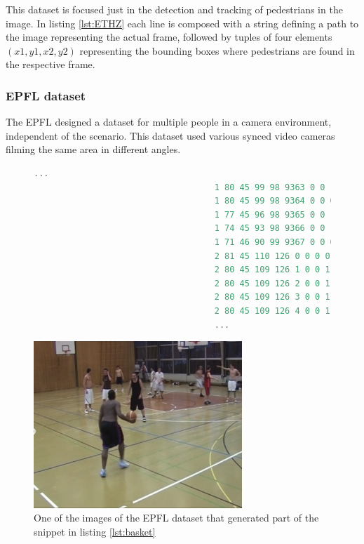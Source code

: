 This dataset is focused just in the detection and tracking of pedestrians in the image. \cite{ETHZEidgenossischeTechnischeHochschuleZurich} In listing \ref{lst:ETHZ} each line is composed with a string defining a path to the image representing the actual frame, followed by tuples of four elements $(x1,y1,x2,y2)$ representing the bounding boxes where pedestrians are found in the respective frame. 

\subsubsection{EPFL dataset}
The EPFL designed a dataset for multiple people in a camera environment, independent of the scenario. This dataset used various synced video cameras filming the same area in different angles. 

\begin{figure}
\begin{center}
	\begin{lstlisting}[label={lst:basket}, caption={ETHZ dataset file snippet.},language=c++]
									...
									1 80 45 99 98 9363 0 0 1 "PERSON"
									1 80 45 99 98 9364 0 0 0 "PERSON"
									1 77 45 96 98 9365 0 0 1 "PERSON"
									1 74 45 93 98 9366 0 0 1 "PERSON"
									1 71 46 90 99 9367 0 0 0 "PERSON"
									2 81 45 110 126 0 0 0 0 "PERSON"
									2 80 45 109 126 1 0 0 1 "PERSON"
									2 80 45 109 126 2 0 0 1 "PERSON"
									2 80 45 109 126 3 0 0 1 "PERSON"
									2 80 45 109 126 4 0 0 1 "PERSON"
									...	\end{lstlisting}
\end{center}
\end{figure}

\begin{figure}[htp]
	
	\centering
	\includegraphics[width=0.7\textwidth]{capstate/imgs/basket.png}
	
	\caption{One of the images of the EPFL dataset that generated part of the snippet in listing \ref{lst:basket} }
	\label{fig:basket}
	
\end{figure}



